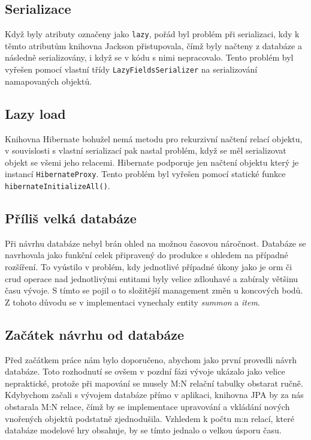 \subsection{Serializace}
Když byly atributy označeny jako \texttt{lazy}, pořád byl problém při serializaci, kdy k těmto atributům knihovna Jackson přistupovala, čímž byly načteny z databáze a následně serializovány, i když se v kódu s nimi nepracovalo. Tento problém byl vyřešen pomocí vlastní třídy \texttt{LazyFieldsSerializer}
na serializování namapovaných objektů. 

\subsection{Lazy load}
Knihovna Hibernate bohužel nemá metodu pro rekurzivní načtení relací objektu, v souvislosti s vlastní serializací pak nastal problém, když se měl serializovat objekt se všemi jeho relacemi. Hibernate podporuje jen načtení objektu který je instancí \texttt{HibernateProxy}. Tento problém byl vyřešen pomocí statické funkce \texttt{hibernateInitializeAll()}. 

\subsection{Příliš velká databáze}
Při návrhu databáze nebyl brán ohled na možnou časovou náročnost. Databáze se navrhovala jako funkční celek připravený do produkce s ohledem na případné rozšíření. To vyústilo v problém, kdy jednotlivé případné úkony jako je \gls{orm} či \gls{crud} operace nad jednotlivými entitami byly velice zdlouhavé a zabíraly většinu času vývoje. S tímto se pojil o to složitější management změn u koncových bodů. Z tohoto důvodu se v implementaci vynechaly entity \textit{summon} a \textit{item}.

\subsection{Začátek návrhu od databáze}
Před začátkem práce nám bylo doporučeno, abychom jako první provedli návrh databáze. Toto rozhodnutí se ovšem v pozdní fázi vývoje ukázalo jako velice nepraktické, protože při mapování se musely M:N relační tabulky obstarat ručně. Kdybychom začali s vývojem databáze přímo v aplikaci, knihovna JPA  by za nás obstarala M:N relace, čímž by se implementace upravování a vkládání nových vnořených objektů podstatně zjednodušila. Vzhledem k počtu m:n relací, které databáze modelové hry obsahuje, by se tímto jednalo o velkou úsporu času.